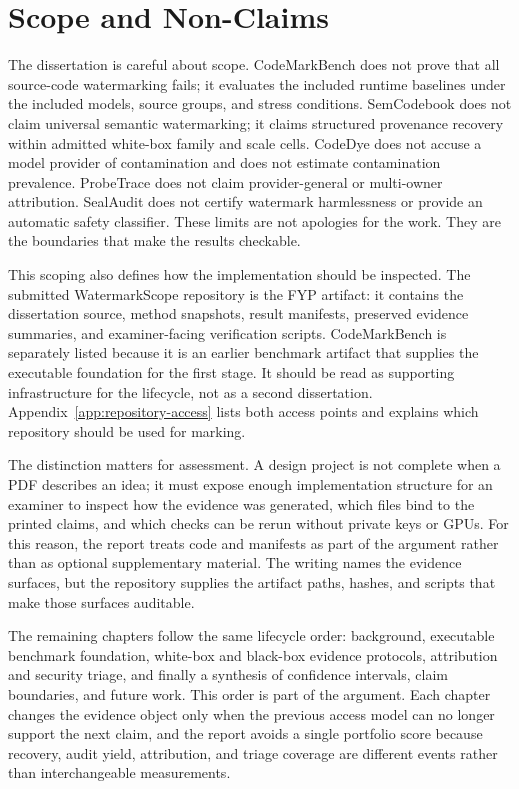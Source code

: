 \section{Scope and Non-Claims}

The dissertation is careful about scope. CodeMarkBench does not prove that all source-code watermarking fails; it evaluates the included runtime baselines under the included models, source groups, and stress conditions. SemCodebook does not claim universal semantic watermarking; it claims structured provenance recovery within admitted white-box family and scale cells. CodeDye does not accuse a model provider of contamination and does not estimate contamination prevalence. ProbeTrace does not claim provider-general or multi-owner attribution. SealAudit does not certify watermark harmlessness or provide an automatic safety classifier. These limits are not apologies for the work. They are the boundaries that make the results checkable.

This scoping also defines how the implementation should be inspected. The submitted WatermarkScope repository is the FYP artifact: it contains the dissertation source, method snapshots, result manifests, preserved evidence summaries, and examiner-facing verification scripts. CodeMarkBench is separately listed because it is an earlier benchmark artifact that supplies the executable foundation for the first stage. It should be read as supporting infrastructure for the lifecycle, not as a second dissertation. Appendix~\ref{app:repository-access} lists both access points and explains which repository should be used for marking.

The distinction matters for assessment. A design project is not complete when a PDF describes an idea; it must expose enough implementation structure for an examiner to inspect how the evidence was generated, which files bind to the printed claims, and which checks can be rerun without private keys or GPUs. For this reason, the report treats code and manifests as part of the argument rather than as optional supplementary material. The writing names the evidence surfaces, but the repository supplies the artifact paths, hashes, and scripts that make those surfaces auditable.

The remaining chapters follow the same lifecycle order: background, executable benchmark foundation, white-box and black-box evidence protocols, attribution and security triage, and finally a synthesis of confidence intervals, claim boundaries, and future work. This order is part of the argument. Each chapter changes the evidence object only when the previous access model can no longer support the next claim, and the report avoids a single portfolio score because recovery, audit yield, attribution, and triage coverage are different events rather than interchangeable measurements.

